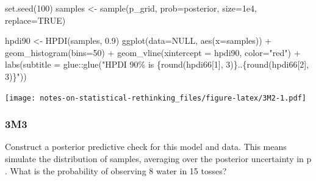 \documentclass[
]{book}
\newenvironment{Shaded}{\begin{snugshade}}{\end{snugshade}}
\newcommand{\AttributeTok}[1]{\textcolor[rgb]{0.77,0.63,0.00}{#1}}
\newcommand{\ConstantTok}[1]{\textcolor[rgb]{0.00,0.00,0.00}{#1}}
\newcommand{\DecValTok}[1]{\textcolor[rgb]{0.00,0.00,0.81}{#1}}
\newcommand{\FloatTok}[1]{\textcolor[rgb]{0.00,0.00,0.81}{#1}}
\newcommand{\FunctionTok}[1]{\textcolor[rgb]{0.00,0.00,0.00}{#1}}
\newcommand{\NormalTok}[1]{#1}
\newcommand{\OtherTok}[1]{\textcolor[rgb]{0.56,0.35,0.01}{#1}}
\newcommand{\SpecialCharTok}[1]{\textcolor[rgb]{0.00,0.00,0.00}{#1}}
\newcommand{\StringTok}[1]{\textcolor[rgb]{0.31,0.60,0.02}{#1}}
\begin{document}
\begin{Shaded}
\begin{Highlighting}[]
\FunctionTok{set.seed}\NormalTok{(}\DecValTok{100}\NormalTok{)}
\NormalTok{samples }\OtherTok{\textless{}{-}} \FunctionTok{sample}\NormalTok{(p\_grid, }\AttributeTok{prob=}\NormalTok{posterior, }\AttributeTok{size=}\FloatTok{1e4}\NormalTok{, }\AttributeTok{replace=}\ConstantTok{TRUE}\NormalTok{)}

\NormalTok{hpdi90 }\OtherTok{\textless{}{-}} \FunctionTok{HPDI}\NormalTok{(samples, }\FloatTok{0.9}\NormalTok{)}
\FunctionTok{ggplot}\NormalTok{(}\AttributeTok{data=}\ConstantTok{NULL}\NormalTok{, }\FunctionTok{aes}\NormalTok{(}\AttributeTok{x=}\NormalTok{samples)) }\SpecialCharTok{+} 
  \FunctionTok{geom\_histogram}\NormalTok{(}\AttributeTok{bins=}\DecValTok{50}\NormalTok{) }\SpecialCharTok{+} 
  \FunctionTok{geom\_vline}\NormalTok{(}\AttributeTok{xintercept =}\NormalTok{ hpdi90, }\AttributeTok{color=}\StringTok{"red"}\NormalTok{) }\SpecialCharTok{+} 
  \FunctionTok{labs}\NormalTok{(}\AttributeTok{subtitle =}\NormalTok{ glue}\SpecialCharTok{::}\FunctionTok{glue}\NormalTok{(}\StringTok{"HPDI 90\% is \{round(hpdi66[1], 3)\}..\{round(hpdi66[2], 3)\}"}\NormalTok{))}
\end{Highlighting}
\end{Shaded}

\texttt{[image: notes-on-statistical-rethinking\_files/figure-latex/3M2-1.pdf]}

\hypertarget{m3-1}{%
\subsubsection*{3M3}\label{m3-1}}

Construct a posterior predictive check for this model and data. This means simulate the distribution of samples, averaging over the posterior uncertainty in p . What is the probability of observing 8 water in 15 tosses?
\end{document}
